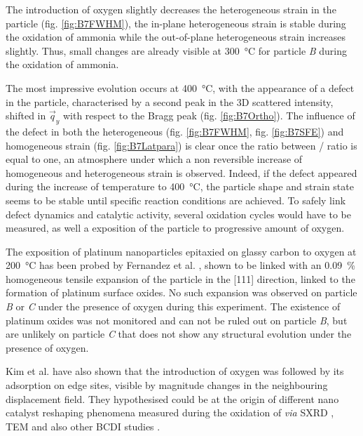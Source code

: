 The introduction of oxygen slightly decreases the heterogeneous strain in the particle (fig. \ref{fig:B7FWHM}), the in-plane heterogeneous strain is stable during the oxidation of ammonia while the out-of-plane heterogeneous strain increases slightly.
Thus, small changes are already visible at \qty{300}{\degreeCelsius} for particle \textit{B} during the oxidation of ammonia.

The most impressive evolution occurs at \qty{400}{\degreeCelsius}, with the appearance of a defect in the particle, characterised by a second peak in the 3D scattered intensity, shifted in $\vec{q}_y$ with respect to the Bragg peak (fig. \ref{fig:B7Ortho}).
The influence of the defect in both the heterogeneous (fig. \ref{fig:B7FWHM}, fig. \ref{fig:B7SFE}) and homogeneous strain (fig. \ref{fig:B7Latpara}) is clear once the ratio between / ratio is equal to one, an atmosphere under which a non reversible increase of homogeneous and heterogeneous strain is observed.
Indeed, if the defect appeared during the increase of temperature to \qty{400}{\degreeCelsius}, the particle shape and strain state seems to be stable until specific reaction conditions are achieved.
To safely link defect dynamics and catalytic activity, several oxidation cycles would have to be measured, as well a exposition of the particle to progressive amount of oxygen.

The exposition of platinum nanoparticles epitaxied on glassy carbon to oxygen at \qty{200}{\degreeCelsius} has been probed by Fernandez et al. \parencite*{Fernandez2019}, shown to be linked with an \qty{0.09}{\percent} homogeneous tensile expansion of the particle in the [111] direction, linked to the formation of platinum surface oxides.
No such expansion was observed on particle \textit{B} or \textit{C} under the presence of oxygen during this experiment.
The existence of platinum oxides was not monitored and can not be ruled out on particle \textit{B}, but are unlikely on particle \textit{C} that does not show any structural evolution under the presence of oxygen.

Kim et al. \parencite*{Kim2018} have also shown that the introduction of oxygen was followed by its adsorption on edge sites, visible by magnitude changes in the neighbouring displacement field.
They hypothesised could be at the origin of different nano catalyst reshaping phenomena measured during the oxidation of  \textit{via} SXRD \parencite{Nolte2008, Hejral2016}, TEM \parencite{Vendelbo2014} and also other BCDI studies \parencite{Abuin2019}.

